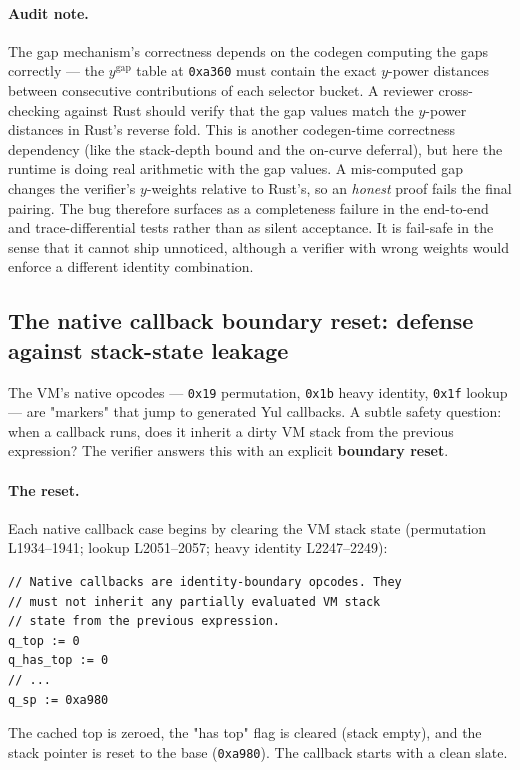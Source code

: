 \paragraph{Audit note.} The gap mechanism's correctness depends on
the codegen computing the gaps correctly --- the $y^{\text{gap}}$
table at \texttt{0xa360} must contain the exact $y$-power
distances between consecutive contributions of each selector
bucket. A reviewer cross-checking against Rust should verify that
the gap values match the $y$-power distances in Rust's reverse
fold. This is another codegen-time correctness dependency (like the
stack-depth bound and the on-curve deferral), but here the
runtime is doing real arithmetic with the gap values. A
mis-computed gap changes the verifier's $y$-weights relative to
Rust's, so an \emph{honest} proof fails the final pairing. The bug
therefore surfaces as a completeness failure in the end-to-end and
trace-differential tests rather than as silent acceptance. It is
fail-safe in the sense that it cannot ship unnoticed, although a
verifier with wrong weights would enforce a different identity
combination.

\subsection{The native callback boundary reset: defense against stack-state leakage}
\label{sec:pr-callback}

The VM's native opcodes --- \texttt{0x19} permutation,
\texttt{0x1b} heavy identity, \texttt{0x1f} lookup --- are
"markers" that jump to generated Yul callbacks. A subtle safety
question: when a callback runs, does it inherit a dirty VM stack
from the previous expression? The verifier answers this with an
explicit \textbf{boundary reset}.

\paragraph{The reset.} Each native callback case begins by
clearing the VM stack state (permutation L1934--1941; lookup
L2051--2057; heavy identity L2247--2249):
\begin{lstlisting}[style=yul]
// Native callbacks are identity-boundary opcodes. They
// must not inherit any partially evaluated VM stack
// state from the previous expression.
q_top := 0
q_has_top := 0
// ...
q_sp := 0xa980
\end{lstlisting}
The cached top is zeroed, the "has top" flag is cleared (stack
empty), and the stack pointer is reset to the base
(\texttt{0xa980}). The callback starts with a clean slate.

